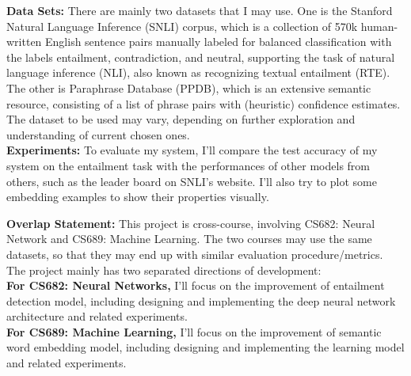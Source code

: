 \documentclass[11pt]{article}
\begin{document}
\textbf{Data Sets: }There are mainly two datasets that I may use. One is the Stanford Natural Language Inference (SNLI) corpus, which is a collection of 570k human-written English sentence pairs manually labeled for balanced classification with the labels entailment, contradiction, and neutral, supporting the task of natural language inference (NLI), also known as recognizing textual entailment (RTE). The other is Paraphrase Database (PPDB), which is an extensive semantic resource, consisting of a list of phrase pairs with (heuristic) confidence estimates. The dataset to be used may vary, depending on further exploration and understanding of current chosen ones.\\

\textbf{Experiments: }To evaluate my system, I'll compare the test accuracy of my system on the entailment task with the performances of other models from others, such as the leader board on SNLI's website. I'll also try to plot some embedding examples to show their properties visually.\\

\newpage

\textbf{Overlap Statement: }This project is cross-course, involving CS682: Neural Network and CS689: Machine Learning. The two courses may use the same datasets, so that they may end up with similar evaluation procedure/metrics. The project mainly has two separated directions of development:\\
\hspace*{0.7cm}\textbf{For CS682: Neural Networks, }I'll focus on the improvement of entailment detection model, including designing and implementing the deep neural network architecture and related experiments.\\
\hspace*{0.7cm}\textbf{For CS689: Machine Learning, }I'll focus on the improvement of semantic word embedding model, including designing and implementing the learning model and related experiments.



\end{document}
